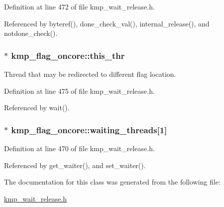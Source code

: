 Definition at line 472 of file kmp\-\_\-wait\-\_\-release.\-h.



Referenced by byteref(), done\-\_\-check\-\_\-val(), internal\-\_\-release(), and notdone\-\_\-check().

\hypertarget{classkmp__flag__oncore_ab6a0844b7170dfffc0c9a748eaa5690e}{
\subsubsection[{this\-\_\-thr}]{$\ast$ kmp\-\_\-flag\-\_\-oncore\-::this\-\_\-thr\hspace{0.3cm}{\ttfamily [private]}}}\label{classkmp__flag__oncore_ab6a0844b7170dfffc0c9a748eaa5690e}
Thread that may be redirected to different flag location. 

Definition at line 475 of file kmp\-\_\-wait\-\_\-release.\-h.



Referenced by wait().

\hypertarget{classkmp__flag__oncore_a613d89c68444df9e34f59ed5ad9790e6}{
\subsubsection[{waiting\-\_\-threads}]{$\ast$ kmp\-\_\-flag\-\_\-oncore\-::waiting\-\_\-threads\mbox{[}1\mbox{]}\hspace{0.3cm}{\ttfamily [private]}}}\label{classkmp__flag__oncore_a613d89c68444df9e34f59ed5ad9790e6}


Definition at line 470 of file kmp\-\_\-wait\-\_\-release.\-h.



Referenced by get\-\_\-waiter(), and set\-\_\-waiter().



The documentation for this class was generated from the following file\-:\begin{DoxyCompactItemize}
\item 
\hyperlink{kmp__wait__release_8h}{kmp\-\_\-wait\-\_\-release.\-h}\end{DoxyCompactItemize}
